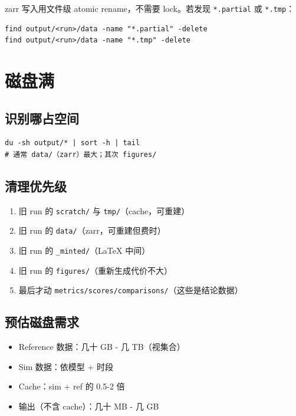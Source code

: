 zarr 写入用文件级 atomic rename，不需要 lock。若发现 \texttt{*.partial} 或 \texttt{*.tmp}：

\begin{verbatim}
find output/<run>/data -name "*.partial" -delete
find output/<run>/data -name "*.tmp" -delete
\end{verbatim}

\section{磁盘满}

\subsection{识别哪占空间}

\begin{verbatim}
du -sh output/* | sort -h | tail
# 通常 data/（zarr）最大；其次 figures/
\end{verbatim}

\subsection{清理优先级}

\begin{enumerate}
  \item 旧 run 的 \texttt{scratch/} 与 \texttt{tmp/}（cache，可重建）
  \item 旧 run 的 \texttt{data/}（zarr，可重建但费时）
  \item 旧 run 的 \texttt{\_minted/}（LaTeX 中间）
  \item 旧 run 的 \texttt{figures/}（重新生成代价不大）
  \item 最后才动 \texttt{metrics/scores/comparisons/}（这些是结论数据）
\end{enumerate}

\subsection{预估磁盘需求}

\begin{itemize}
  \item Reference 数据：几十 GB - 几 TB（视集合）
  \item Sim 数据：依模型 + 时段
  \item Cache：sim + ref 的 0.5-2 倍
  \item 输出（不含 cache）：几十 MB - 几 GB
\end{itemize}

